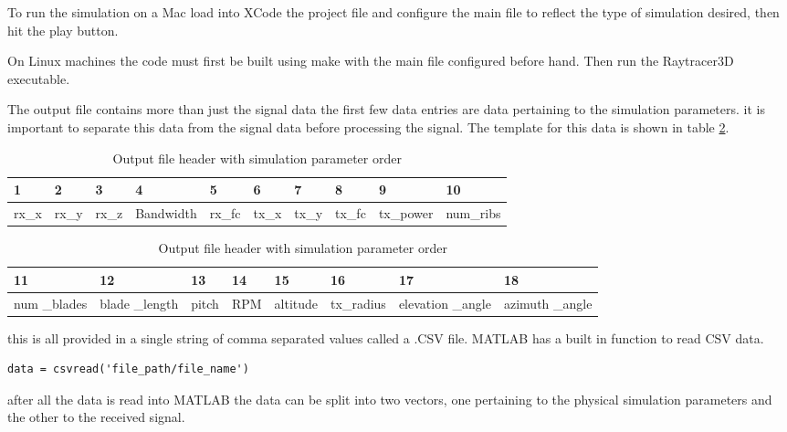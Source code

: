To run the simulation on a Mac load into XCode the project file and configure the main file to reflect the type of simulation desired, then hit the play button.

On Linux machines the code must first be built using make with the main file configured before hand. Then run the Raytracer3D executable.

The output file contains more than just the signal data the first few data entries are data pertaining to the simulation parameters. it is important to separate this data from the signal data before processing the signal. The template for this data is shown in table 
\ref{tab:file_values}.

\begin{table}
\begin{center}
    \begin{tabular}{| l | l | l | l | l | l | l | l | l | l |}
    \hline
    1 & 2 & 3 & 4 & 5 & 6 & 7 & 8 & 9 & 10 \\ \hline
      rx\_x & rx\_y & rx\_z & Bandwidth & rx\_fc & tx\_x & tx\_y & tx\_fc & tx\_power & num\_ribs \\ \hline
    \end{tabular}
    \begin{tabular}{| p{1cm} | p{1cm} | l | l | l | l | p{1.5cm} | p{1.5cm} |}
    \hline
    11 & 12 & 13 & 14 & 15 & 16 & 17 & 18\\ \hline
     num \_blades & blade \_length & pitch & RPM & altitude & tx\_radius & elevation \_angle & azimuth \_angle \\ \hline
    \end{tabular}
     \caption{Output file header with simulation parameter order}
    \label{tab:file_values}
\end{center}
\end{table}

this is all provided in a single string of comma separated values called a .CSV file. MATLAB has a built in function to read CSV data.

\begin{lstlisting}
data = csvread('file_path/file_name')
\end{lstlisting}

after all the data is read into MATLAB the data can be split into two vectors, one pertaining to the physical simulation parameters and the other to the received signal.


 